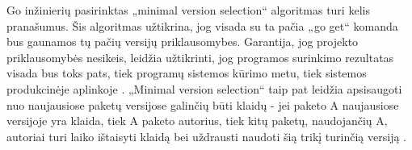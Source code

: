 Go inžinierių pasirinktas „minimal version selection“ algoritmas turi kelis pranašumus.
Šis algoritmas užtikrina, jog visada su ta pačia „go get“ komanda bus gaunamos tų pačių versijų priklausomybes.
Garantija, jog projekto priklausomybės nesikeis, leidžia užtikrinti, jog programos surinkimo rezultatas visada bus toks pats,
tiek programų sistemos kūrimo metu, tiek sistemos produkcinėje aplinkoje \cite{COX18a}. „Minimal version selection“ taip pat
leidžia apsisaugoti nuo naujausiose paketų versijose galinčių būti klaidų - jei paketo A naujausiose versijoje yra klaida,
tiek A paketo autorius, tiek kitų paketų, naudojančių A, autoriai turi laiko ištaisyti klaidą bei
uždrausti naudoti šią trikį turinčią versiją \cite{COX18e}.

